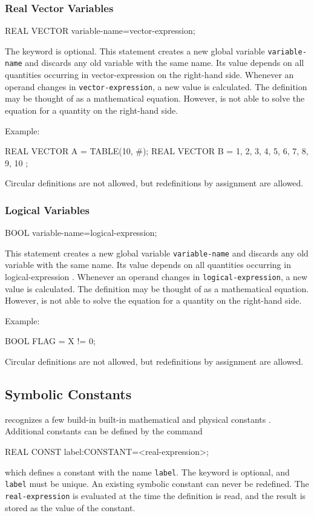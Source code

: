 \subsubsection{Real Vector Variables}
\begin{example}
REAL VECTOR variable-name=vector-expression;
\end{example}
The keyword  is optional.
This statement creates a new global variable \texttt{variable-name}
and discards any old variable with the same name.
Its value depends on all quantities occurring
in {vector-expression}  on the right-hand side.
Whenever an operand changes in \texttt{vector-expression},
a new value is calculated.
The definition may be thought of as a mathematical equation.
However, \opal is not able to solve the equation for a quantity on the
right-hand side.

\noindent Example:
\begin{example}
REAL VECTOR A = TABLE(10, #);
REAL VECTOR B = { 1, 2, 3, 4, 5, 6, 7, 8, 9, 10 };
\end{example}
Circular definitions are not allowed, but redefinitions by assignment
are allowed.

\subsubsection{Logical Variables}
\begin{example}
BOOL variable-name=logical-expression;
\end{example}
This statement creates a new global variable \texttt{variable-name}
and discards any old variable with the same name.
Its value depends on all quantities occurring
in {logical-expression} .
Whenever an operand changes in \texttt{logical-expression},
a new value is calculated.
The definition may be thought of as a mathematical equation.
However, \opal is not able to solve the equation for a quantity on the
right-hand side.

\noindent Example:
\begin{example}
BOOL FLAG = X != 0;
\end{example}
Circular definitions are not allowed, but redefinitions by assignment
are allowed.

\subsection{Symbolic Constants}
\label{sec:constant}
\opal recognizes a few build-in built-in mathematical and physical
constants .
Additional constants can be defined by the command
\begin{example}
REAL CONST label:CONSTANT=<real-expression>;
\end{example}
which defines a constant with the name \texttt{label}.
The keyword  is optional, and \texttt{label} must be unique.
An existing symbolic constant can never be redefined.
The \texttt{real-expression} is evaluated at the time the
 definition is read, and the result is stored as the
value of the constant.


